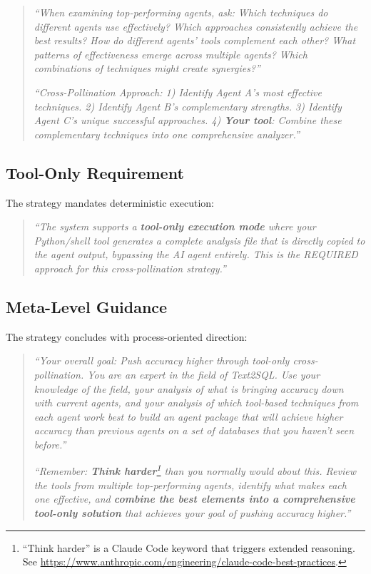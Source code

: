 \documentclass{article}
\begin{document}
\begin{quote}
\textit{``When examining top-performing agents, ask: Which techniques do different agents use effectively? Which approaches consistently achieve the best results? How do different agents' tools complement each other? What patterns of effectiveness emerge across multiple agents? Which combinations of techniques might create synergies?''}

\textit{``Cross-Pollination Approach: 1) Identify Agent A's most effective techniques. 2) Identify Agent B's complementary strengths. 3) Identify Agent C's unique successful approaches. 4) \textbf{Your tool}: Combine these complementary techniques into one comprehensive analyzer.''}
\end{quote}

\subsection{Tool-Only Requirement}

The strategy mandates deterministic execution:

\begin{quote}
\textit{``The system supports a \textbf{tool-only execution mode} where your Python/shell tool generates a complete analysis file that is directly copied to the agent output, bypassing the AI agent entirely. This is the REQUIRED approach for this cross-pollination strategy.''}

\end{quote}

\subsection{Meta-Level Guidance}

The strategy concludes with process-oriented direction:

\begin{quote}
\textit{``Your overall goal: Push accuracy higher through tool-only cross-pollination. You are an expert in the field of Text2SQL. Use your knowledge of the field, your analysis of what is bringing accuracy down with current agents, and your analysis of which tool-based techniques from each agent work best to build an agent package that will achieve higher accuracy than previous agents on a set of databases that you haven't seen before.''}

\textit{``Remember: \textbf{Think harder}\footnote{``Think harder'' is a Claude Code keyword that triggers extended reasoning. See \url{https://www.anthropic.com/engineering/claude-code-best-practices}.} than you normally would about this. Review the tools from multiple top-performing agents, identify what makes each one effective, and \textbf{combine the best elements into a comprehensive tool-only solution} that achieves your goal of pushing accuracy higher.''}
\end{quote}
\end{document}
